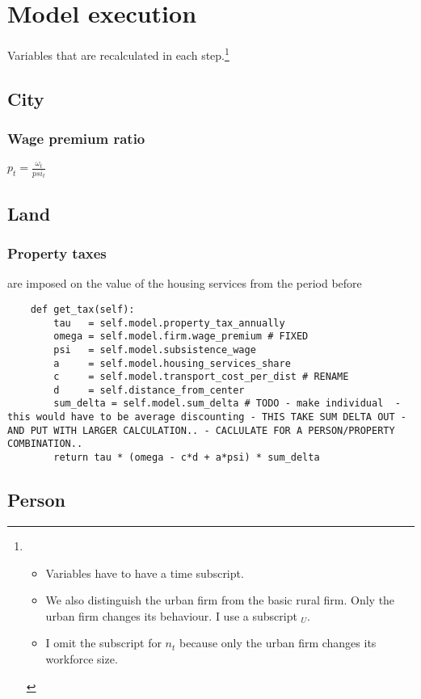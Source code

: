 \section{Model execution}
Variables that are recalculated in each step.\footnote{\begin{itemize}
    \item Variables have to have a time subscript. 
    \item We also distinguish the urban firm from the basic rural firm.  Only the urban firm changes its behaviour.  I use a subscript $_U$. 
    \item I omit the subscript for $n_t$ because only the urban firm changes its workforce size.
\end{itemize} }


\subsection{City}
\subsubsection{Wage premium ratio}

$p_t= \frac{\omega_t}{psi_t}$ 


\subsection{Land}

\subsubsection{Property taxes}
are imposed on the value of the housing services from the period before
\begin{lstlisting}
    def get_tax(self):
        tau   = self.model.property_tax_annually
        omega = self.model.firm.wage_premium # FIXED
        psi   = self.model.subsistence_wage
        a     = self.model.housing_services_share
        c     = self.model.transport_cost_per_dist # RENAME
        d     = self.distance_from_center
        sum_delta = self.model.sum_delta # TODO - make individual  - this would have to be average discounting - THIS TAKE SUM DELTA OUT - AND PUT WITH LARGER CALCULATION.. - CACLULATE FOR A PERSON/PROPERTY COMBINATION..
        return tau * (omega - c*d + a*psi) * sum_delta
\end{lstlisting}

\subsection{Person}

